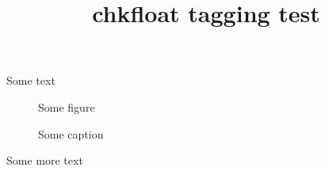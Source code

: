 \documentclass{article}
\title{chkfloat tagging test}
\begin{document}
Some text
\begin{figure}
Some figure
\caption{Some caption}
\end{figure}
Some more text
\end{document}
